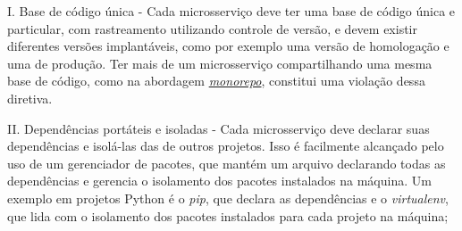 







I. Base de código única - Cada microsserviço deve ter uma base de código única e particular, com rastreamento utilizando controle de versão, e devem existir diferentes versões implantáveis, como por exemplo uma versão de homologação e uma de produção. Ter mais de um microsserviço compartilhando uma mesma base de código, como na abordagem \hyperref[subsecao-monorepo]{\emph{monorepo}}, constitui uma violação dessa diretiva.

II. Dependências portáteis e isoladas - Cada microsserviço deve declarar suas dependências e isolá-las das de outros projetos. Isso é facilmente alcançado pelo uso de um gerenciador de pacotes, que mantém um arquivo declarando todas as dependências e gerencia o isolamento dos pacotes instalados na máquina. Um exemplo em projetos Python é o \emph{pip}, que declara as dependências e o \emph{virtualenv}, que lida com o isolamento dos pacotes instalados para cada projeto na máquina;

